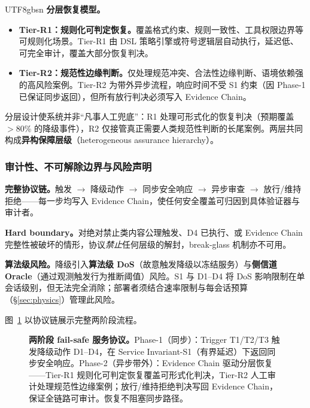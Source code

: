 \documentclass[letterpaper,twocolumn,10pt]{article}
\begin{document}
\begin{CJK}{UTF8}{gbsn}
\textbf{分层恢复模型。}

\begin{itemize}[nosep,leftmargin=*]
\item \textbf{Tier-R1：规则化可判定恢复。}覆盖格式约束、规则一致性、工具权限边界等可规则化场景。Tier-R1 由 DSL 策略引擎或符号逻辑层自动执行，延迟低、可完全审计，覆盖大部分恢复判决。
\item \textbf{Tier-R2：规范性边缘判断。}仅处理规范冲突、合法性边缘判断、语境依赖强的高风险案例。Tier-R2 为带外异步流程，响应时间不受 S1 约束（因 Phase-1 已保证同步返回），但所有放行判决必须写入 Evidence Chain。
\end{itemize}

\noindent 分层设计使系统并非``凡事人工兜底''：R1 处理可形式化的恢复判决（预期覆盖 $>$80\% 的降级事件），R2 仅接管真正需要人类规范性判断的长尾案例。两层共同构成\textbf{异构保障层级}（heterogeneous assurance hierarchy）。

\subsubsection{审计性、不可解除边界与风险声明}
\label{sec:degrade-audit}

\textbf{完整协议链。}触发 $\to$ 降级动作 $\to$ 同步安全响应 $\to$ 异步审查 $\to$ 放行/维持拒绝——每一步均写入 Evidence Chain，使任何安全覆盖可归因到具体验证器与审计者。

\textbf{Hard boundary。}对绝对禁止类内容公理触发、D4 已执行、或 Evidence Chain 完整性被破坏的情形，协议\emph{禁止}任何层级的解封，break-glass 机制亦不可用。

\textbf{算法级风险。}降级引入\textbf{算法级 DoS}（故意触发降级以冻结服务）与\textbf{侧信道 Oracle}（通过观测触发行为推断阈值）风险。S1 与 D1--D4 将 DoS 影响限制在单会话级别，但无法完全消除；部署者须结合速率限制与每会话预算（\S\ref{sec:physics}）管理此风险。

图~\ref{fig:degradation} 以协议链展示完整两阶段流程。

\begin{figure}[t]
\centering
{}
\caption{\textbf{两阶段 fail-safe 服务协议。}Phase-1（同步）：Trigger T1/T2/T3 触发降级动作 D1--D4，在 Service Invariant-S1（有界延迟）下返回同步安全响应。Phase-2（异步带外）：Evidence Chain 驱动分层恢复——Tier-R1 规则化可判定恢复覆盖可形式化判决，Tier-R2 人工审计处理规范性边缘案例；放行/维持拒绝判决写回 Evidence Chain，保证全链路可审计。恢复不阻塞同步路径。}
\label{fig:degradation}
\end{figure}


\end{CJK}
\end{document}

